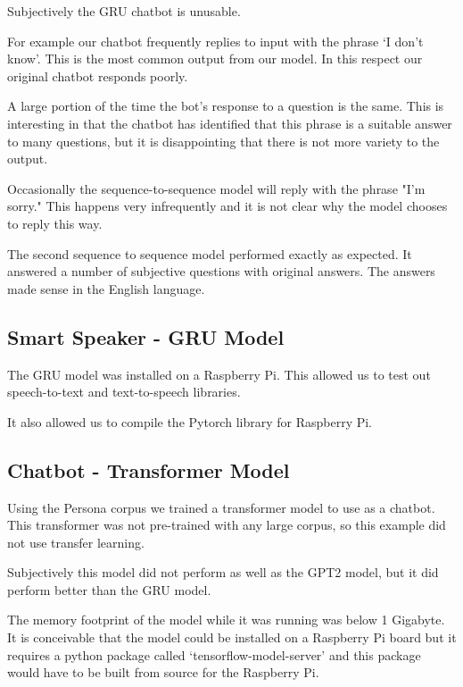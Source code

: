 Subjectively the GRU chatbot is unusable.

For example our chatbot frequently replies to input with the phrase `I don't know'. This is the most common output from our model. In this respect our original chatbot responds poorly.

A large portion of the time the bot's 
response to a question is the same. This is interesting in that the chatbot has identified that this phrase is a suitable answer to many questions, but it is disappointing that there is not more variety to the output.  

Occasionally the sequence-to-sequence model will reply with the phrase "I'm sorry." This happens
very infrequently and it is not clear why the model chooses to reply this way. 

The second sequence to sequence model performed exactly as expected. It answered a number of subjective questions with original answers. The answers made sense in the English language.

\subsection{Smart Speaker - GRU Model}

The GRU model was installed on a Raspberry Pi. This allowed us to test out speech-to-text and 
text-to-speech libraries. 

It also allowed us to compile the Pytorch library for Raspberry Pi.



\subsection{Chatbot - Transformer Model}
Using the Persona corpus we trained a transformer model to use as a chatbot. This transformer was not pre-trained with any large corpus, so this example did not use transfer learning. 

Subjectively this model did not perform as well as the GPT2 model, but it did perform better than the GRU model.

The memory footprint of the model while it was running was below 1 Gigabyte. It is conceivable that the model could be installed on a Raspberry Pi board but it requires a python package called `tensorflow-model-server' and this package would have to be built from source for the Raspberry Pi. 

